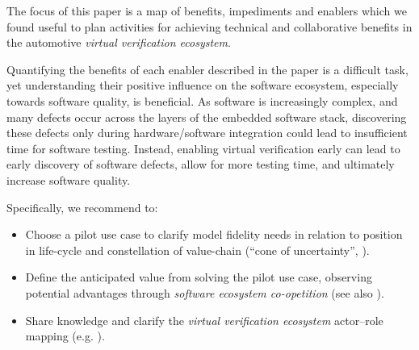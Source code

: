 The focus of this paper is a map of benefits, impediments and enablers which we found useful to plan activities for achieving technical and collaborative benefits in the automotive \emph{virtual verification ecosystem}.

Quantifying the benefits of each enabler described in the paper is a difficult task,
yet understanding their positive influence on the software ecosystem, especially towards software quality, is beneficial.
As software is increasingly complex, and many defects occur across the layers of the embedded software stack, discovering these defects only during hardware/software integration could lead to %
insufficient time for software testing.
Instead, enabling %
virtual verification %
early %
can lead to early discovery of software defects, %
allow for more testing time, %
and ultimately increase software quality.

Specifically, we recommend to:
\begin{itemize}
    \item Choose a pilot use case to clarify model fidelity needs in relation to position in life-cycle and constellation of value-chain (``cone of uncertainty'', \cite{Boehm1981}).
    \item Define the anticipated value from solving the pilot use case, observing potential advantages through \emph{software ecosystem co-opetition} (see also \cite{Agerfalk2008}).
    \item %
    {Share} knowledge and clarify %
    the \emph{virtual verification ecosystem} actor--role mapping (e.g. \cite{kilamo2012proprietary}).
\end{itemize}

